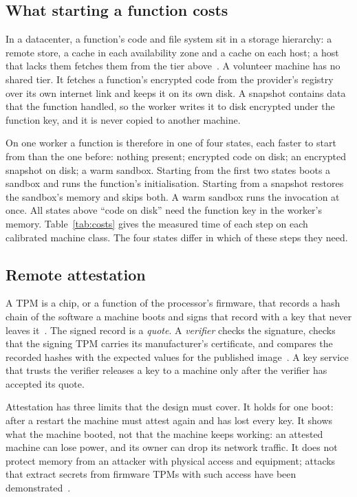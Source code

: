\subsection{What starting a function costs}
\label{sec:bg-start}

In a datacenter, a function's code and file system sit in a storage hierarchy: a remote store, a cache in each
availability zone and a cache on each host; a host that lacks them fetches them from the tier
above~\cite{brooker2023ondemand}. A volunteer machine has no shared tier. It fetches a function's encrypted code from
the provider's registry over its own internet link and keeps it on its own disk. A snapshot contains data that the
function handled, so the worker writes it to disk encrypted under the function key, and it is never copied to another
machine.

On one worker a function is therefore in one of four states, each faster to start from than the one before:
nothing present; encrypted code on disk; an encrypted snapshot on disk; a warm sandbox. Starting from the first two
states boots a sandbox and runs the function's initialisation. Starting from a snapshot restores the sandbox's memory
and skips both. A warm sandbox runs the invocation at once. All states above ``code on disk'' need the function key
in the worker's memory. Table~\ref{tab:costs} gives the measured time of each step on each calibrated machine class.
The four states differ in which of these steps they need.

\subsection{Remote attestation}
\label{sec:bg-attest}

A TPM is a chip, or a function of the processor's firmware, that records a hash chain of the software a machine
boots and signs that record with a key that never leaves it~\cite{tcg2019tpm}. The signed record is a \emph{quote}.
A \emph{verifier} checks the signature, checks that the signing TPM carries its manufacturer's certificate, and
compares the recorded hashes with the expected values for the published image~\cite{rfc9334,schear2016keylime}. A key
service that trusts the verifier releases a key to a machine only after the verifier has accepted its quote.

Attestation has three limits that the design must cover. It holds for one boot: after a restart the machine must
attest again and has lost every key. It shows what the machine booted, not that the machine keeps working: an attested
machine can lose power, and its owner can drop its network traffic. It does not protect memory from an attacker with
physical access and equipment; attacks that extract secrets from firmware TPMs with such access have been
demonstrated~\cite{jacob2023faultpm}.

